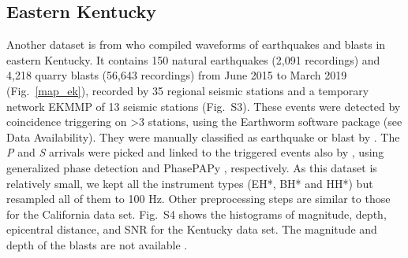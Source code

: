 \documentclass{gji}
\begin{document}
\subsection{Eastern Kentucky}
Another dataset is from \cite{miao} who compiled waveforms of earthquakes and blasts in eastern Kentucky. It contains 150 natural earthquakes (2,091 recordings) and 4,218 quarry blasts (56,643 recordings) from June 2015 to March 2019 (Fig.~\ref{map_ek}), recorded by 35 regional seismic stations and a temporary network EKMMP of 13 seismic stations (Fig.~S3). These events were detected by coincidence triggering on \textgreater{3} stations, using the Earthworm software package (see Data Availability). They were manually classified as earthquake or blast by \cite{miao}. The \textit{P} and \textit{S} arrivals were picked and linked to the triggered events also by \cite{miao}, using generalized phase detection \citep[GPD,][]{gpd} and PhasePAPy \citep{phasepapy}, respectively. As this dataset is relatively small, we kept all the instrument types (EH*, BH* and HH*) but resampled all of them to 100 Hz. Other preprocessing steps are similar to those for the California data set. Fig.~S4 shows the histograms of magnitude, depth, epicentral distance, and SNR for the Kentucky data set. The magnitude and depth of the blasts are not available \citep{miao}.
\end{document}
